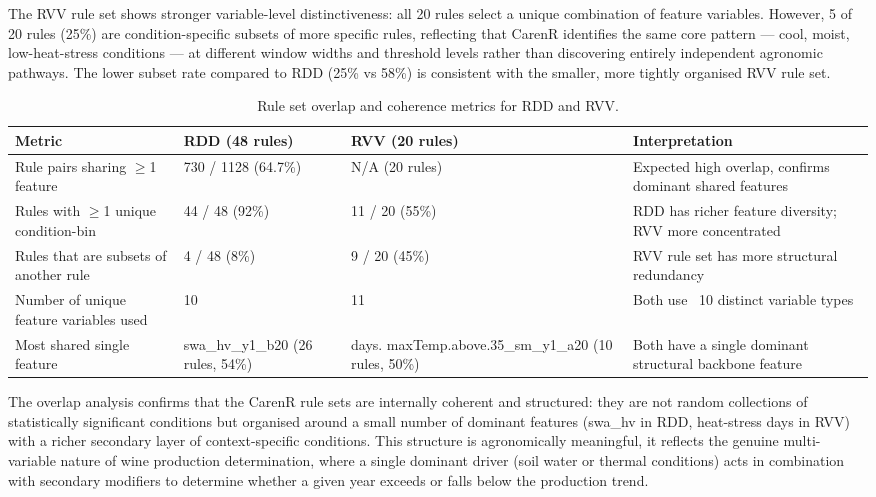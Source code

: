 The RVV rule set shows stronger variable-level distinctiveness: all 20 rules select a unique combination of feature variables. However, 5 of 20 rules (25\%) are condition-specific subsets of more specific rules, reflecting that CarenR identifies the same core pattern --- cool, moist, low-heat-stress conditions --- at different window widths and threshold levels rather than discovering entirely independent agronomic pathways. The lower subset rate compared to RDD (25\% vs 58\%) is consistent with the smaller, more tightly organised RVV rule set.

\begin{table}[htbp]
  \centering
  \caption{Rule set overlap and coherence metrics for RDD and RVV.}\label{tab:ch4b_3}
  \small
  \setlength{\tabcolsep}{4pt}
  \begin{adjustbox}{max width=\textwidth}
    \begin{tabularx}{\textwidth}{p{3.6cm}|p{3cm}|p{2.4cm}|X}
  \toprule
  Metric & RDD (48 rules) & RVV (20 rules) & Interpretation \\
  \midrule
  Rule pairs sharing $\geq$1 feature & 730 / 1128 (64.7\%) & N/A (20 rules) & Expected high overlap, confirms dominant shared features \\
  Rules with $\geq$1 unique condition-bin & 44 / 48 (92\%) & 11 / 20 (55\%) & RDD has richer feature diversity; RVV more concentrated \\
  Rules that are subsets of another rule & 4 / 48 (8\%) & 9 / 20 (45\%) & RVV rule set has more structural redundancy \\
  Number of unique feature variables used & 10 & 11 & Both use ~10 distinct variable types \\
  Most shared single feature & swa\_hv\_y1\_b20 (26 rules, 54\%) & days. \newline maxTemp.above.35\_sm\_y1\_a20 \newline (10 rules, 50\%) & Both have a single dominant structural backbone feature \\
  \bottomrule
\end{tabularx}
  \end{adjustbox}

\end{table}


The overlap analysis confirms that the CarenR rule sets are internally coherent and structured: they are not random collections of statistically significant conditions but organised around a small number of dominant features (swa\_hv in RDD, heat-stress days in RVV) with a richer secondary layer of context-specific conditions. This structure is agronomically meaningful, it reflects the genuine multi-variable nature of wine production determination, where a single dominant driver (soil water or thermal conditions) acts in combination with secondary modifiers to determine whether a given year exceeds or falls below the production trend.


